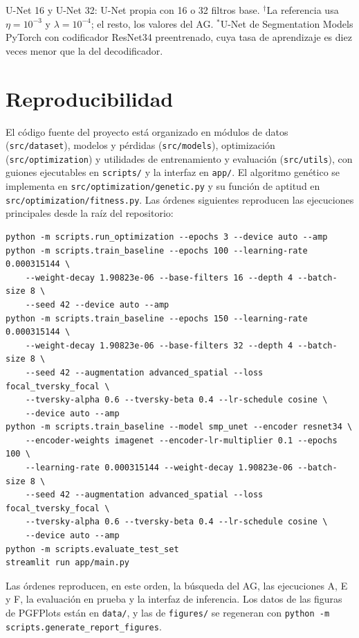 \begin{table}[htbp]
  \smallskip
  \parbox{0.92\linewidth}{\footnotesize U-Net 16 y U-Net 32: U-Net propia con 16 o 32 filtros base. $^{\dagger}$La referencia usa $\eta=10^{-3}$ y $\lambda=10^{-4}$; el resto, los valores del AG. $^{\ast}$U-Net de Segmentation Models PyTorch con codificador ResNet34 preentrenado, cuya tasa de aprendizaje es diez veces menor que la del decodificador.}
\end{table}

\section{Reproducibilidad}\label{app:reproducibilidad}

El código fuente del proyecto está organizado en módulos de datos (\texttt{src/dataset}), modelos y pérdidas (\texttt{src/models}), optimización (\texttt{src/optimization}) y utilidades de entrenamiento y evaluación (\texttt{src/utils}), con guiones ejecutables en \texttt{scripts/} y la interfaz en \texttt{app/}. El algoritmo genético se implementa en \texttt{src/optimization/genetic.py} y su función de aptitud en \texttt{src/optimization/fitness.py}. Las órdenes siguientes reproducen las ejecuciones principales desde la raíz del repositorio:

\begin{footnotesize}
\begin{verbatim}
python -m scripts.run_optimization --epochs 3 --device auto --amp
python -m scripts.train_baseline --epochs 100 --learning-rate 0.000315144 \
    --weight-decay 1.90823e-06 --base-filters 16 --depth 4 --batch-size 8 \
    --seed 42 --device auto --amp
python -m scripts.train_baseline --epochs 150 --learning-rate 0.000315144 \
    --weight-decay 1.90823e-06 --base-filters 32 --depth 4 --batch-size 8 \
    --seed 42 --augmentation advanced_spatial --loss focal_tversky_focal \
    --tversky-alpha 0.6 --tversky-beta 0.4 --lr-schedule cosine \
    --device auto --amp
python -m scripts.train_baseline --model smp_unet --encoder resnet34 \
    --encoder-weights imagenet --encoder-lr-multiplier 0.1 --epochs 100 \
    --learning-rate 0.000315144 --weight-decay 1.90823e-06 --batch-size 8 \
    --seed 42 --augmentation advanced_spatial --loss focal_tversky_focal \
    --tversky-alpha 0.6 --tversky-beta 0.4 --lr-schedule cosine \
    --device auto --amp
python -m scripts.evaluate_test_set
streamlit run app/main.py
\end{verbatim}
\end{footnotesize}

Las órdenes reproducen, en este orden, la búsqueda del AG, las ejecuciones A, E y F, la evaluación en prueba y la interfaz de inferencia. Los datos de las figuras de PGFPlots están en \texttt{data/}, y las de \texttt{figures/} se regeneran con \texttt{python -m scripts.generate\_report\_figures}.
